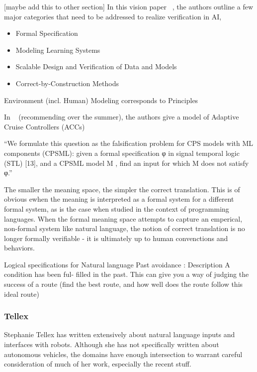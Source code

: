 \documentclass[a4paper, 11pt]{article}
\begin{document}
[maybe add this to other section]
In this vision paper ~\cite{seshia2016towards}, the authors outline a few major
categories that need to be addressed to realize verification in AI,

\begin{itemize}
\item Formal Specification
\item Modeling Learning Systems
\item Scalable Design and Verification of Data and Models
\item Correct-by-Construction Methods
\end{itemize}

Environment (incl. Human) Modeling corresponds to Principles

In ~\cite{dreossiDS19} (recommending over the summer), the authors give a model of Adaptive Cruise Controllers (ACCs)

``We formulate this question as the falsification problem for CPS models with
ML components (CPSML): given a formal specification φ in signal temporal
logic (STL) [13], and a CPSML model M , find an input for which M does not
satisfy φ.''

The smaller the meaning space, the simpler the correct translation. This is of
obvious ewhen the meaning is interpreted as a formal system for a different
formal system, as is the case when studied in the context of programming
languages. When the formal meaning space attempts to capture an emperical,
non-formal system like natural language, the notion of correct translation is no
longer formally verifiable - it is ultimately up to human convenctions and
behaviors.

Logical specifications for Natural language
Past avoidance : Description
A condition has been ful-
filled in the past. This can give you a way of judging the success of a route (find the best route, and how well does the route follow this ideal route)





\subsubsection{Tellex}

Stephanie Tellex has written extensively about natural language inputs and
interfaces with robots. Although she has not specifically written about
autonomous vehicles, the domains have enough intersection to warrant careful
consideration of much of her work, especially the recent stuff.
\end{document}
